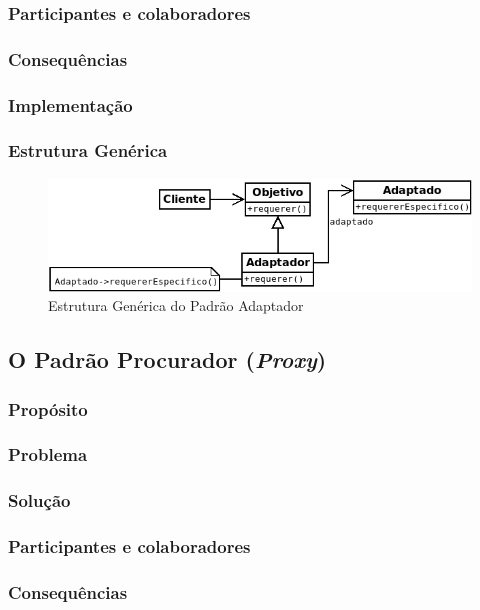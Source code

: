 \subsubsection{Participantes e colaboradores}
\subsubsection{Consequências}
\subsubsection{Implementação}
\subsubsection{Estrutura Genérica}

\begin{figure}[h]
\begin{center}
\includegraphics[scale=0.6]{adaptador.png}
\caption{Estrutura Genérica do Padrão Adaptador}\label{fig:adaptador}
\end{center}
\end{figure}

\subsection{O Padrão Procurador (\textit{Proxy})}
\subsubsection{Propósito}
\subsubsection{Problema}
\subsubsection{Solução}
\subsubsection{Participantes e colaboradores}
\subsubsection{Consequências}
